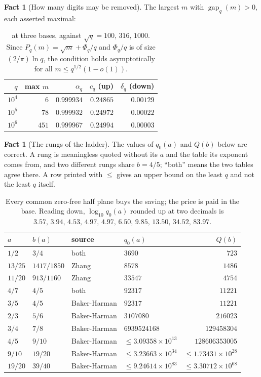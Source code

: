 \documentclass[11pt]{amsart}
\theoremstyle{definition}
\newtheorem{fact}[theorem]{Fact}
\theoremstyle{remark}
\begin{document}
\begin{fact}[How many digits may be removed]
\label{fact:multi}
The largest $m$ with $\operatorname{gap}_q(m) > 0$, each asserted maximal:
\end{fact}

\begin{table}[h]
\centering
\begin{tabular}{rrrrr}
\toprule
$q$ & max $m$ & $\alpha_q$ & $c_q$ (up) & $\delta_q$ (down) \\
\midrule
$10^4$ & $6$ & $0.999934$ & $0.24865$ & $0.00129$ \\
$10^5$ & $78$ & $0.999932$ & $0.24972$ & $0.00022$ \\
$10^6$ & $451$ & $0.999967$ & $0.24994$ & $0.00003$ \\
\bottomrule
\end{tabular}
\caption{ at three bases, against $\sqrt q = 100,\, 316,\, 1000$. Since $P_q(m) = \sqrt m + \Phi_q/q$ and $\Phi_q/q$ is of size $(2/\pi)\ln q$, the condition holds asymptotically for all $m \le q^{1/2}(1 - o(1))$.}
\label{tab:multi}
\end{table}

\begin{fact}[The rungs of the ladder]
\label{fact:ladder}
The values of $q_0(a)$ and $Q(b)$ below are correct. A rung is meaningless quoted without its $a$ and the table its exponent comes from, and two different rungs share $b = 4/5$; ``both'' means the two tables agree there. A row printed with $\le$ gives an upper bound on the least $q$ and not the least $q$ itself.
\end{fact}

\begin{table}[h]
\centering
\begin{tabular}{llllr}
\toprule
$a$ & $b(a)$ & source & $q_0(a)$ & $Q(b)$ \\
\midrule
$1/2$ & $3/4$ & both & $3690$ & $723$ \\
$13/25$ & $1417/1850$ & Zhang & $8578$ & $1486$ \\
$11/20$ & $913/1160$ & Zhang & $33547$ & $4754$ \\
$4/7$ & $4/5$ & both & $92317$ & $11221$ \\
$3/5$ & $4/5$ & Baker-Harman & $92317$ & $11221$ \\
$2/3$ & $5/6$ & Baker-Harman & $3107080$ & $216023$ \\
$3/4$ & $7/8$ & Baker-Harman & $6939524168$ & $129458304$ \\
$4/5$ & $9/10$ & Baker-Harman & $\le 3.09358 \times 10^{13}$ & $128606353005$ \\
$9/10$ & $19/20$ & Baker-Harman & $\le 3.23663 \times 10^{34}$ & $\le 1.73431 \times 10^{28}$ \\
$19/20$ & $39/40$ & Baker-Harman & $\le 9.24614 \times 10^{83}$ & $\le 3.30712 \times 10^{68}$ \\
\bottomrule
\end{tabular}
\caption{Every common zero-free half plane buys the saving; the price is paid in the base. Reading down, $\log_{10} q_0(a)$ rounded up at two decimals is $3.57,\, 3.94,\, 4.53,\, 4.97,\, 4.97,\, 6.50,\, 9.85,\, 13.50,\, 34.52,\, 83.97$.}
\label{tab:ladder}
\end{table}
\end{document}

